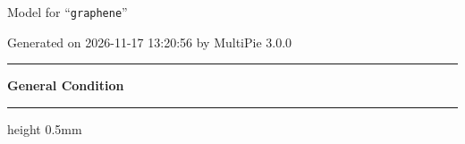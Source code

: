 \documentclass[fleqn,10pt,landscape]{jsarticle}
\begin{document}
\setcounter{MaxMatrixCols}{32}

\renewcommand{\tablename}{Table~}
\renewcommand{\figurename}{Figure~}
\setlength{\baselineskip}{16pt}
\setlength{\parindent}{0pt}
\setlength{\mathindent}{0pt}
\footnotesize
\begin{center}
\LARGE
Model for ``\texttt{graphene}''
\end{center}
\begin{flushright}
Generated on 2026-11-17 13:20:56 by MultiPie 3.0.0
\end{flushright}
\setlength{\baselineskip}{16pt}
\footnotesize
\vspace{5mm}
\noindent \rule[0.5mm]{5mm}{0.5mm}\hspace{3mm}\textbf{General Condition}\hspace{3mm}\leaders\hrule height 0.5mm\hfill\kern0pt
\vspace{3mm}
\end{document}
